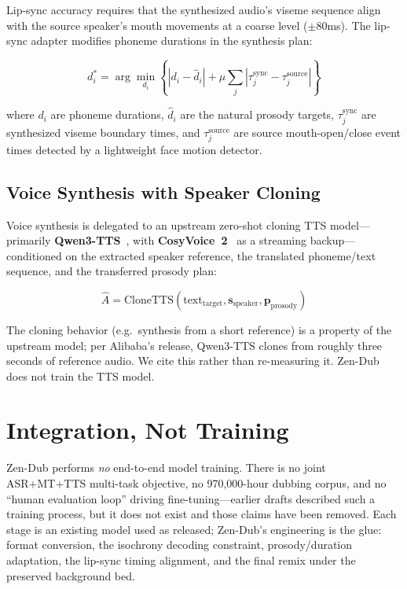 \documentclass[11pt,a4paper]{article}
\begin{document}
Lip-sync accuracy requires that the synthesized audio's viseme sequence align with
the source speaker's mouth movements at a coarse level ($\pm$80ms). The lip-sync
adapter modifies phoneme durations in the synthesis plan:

\begin{equation}
d_i^* = \arg\min_{d_i} \left\{ |d_i - \hat{d}_i| + \mu \sum_j | \tau_j^{\text{sync}} - \tau_j^{\text{source}} | \right\}
\end{equation}

where $d_i$ are phoneme durations, $\hat{d}_i$ are the natural prosody targets,
$\tau_j^{\text{sync}}$ are synthesized viseme boundary times, and $\tau_j^{\text{source}}$
are source mouth-open/close event times detected by a lightweight face motion detector.

\subsection{Voice Synthesis with Speaker Cloning}

Voice synthesis is delegated to an upstream zero-shot cloning TTS model---primarily
\textbf{Qwen3-TTS}~\cite{qwen3tts}, with \textbf{CosyVoice~2}~\cite{cosyvoice2} as a
streaming backup---conditioned on the extracted speaker reference, the translated
phoneme/text sequence, and the transferred prosody plan:

\begin{equation}
\hat{A} = \text{CloneTTS}\!\left(\text{text}_{\text{target}}, \mathbf{s}_{\text{speaker}}, \mathbf{p}_{\text{prosody}}\right)
\end{equation}

The cloning behavior (e.g.\ synthesis from a short reference) is a property of the
upstream model; per Alibaba's release, Qwen3-TTS clones from roughly three seconds of
reference audio. We cite this rather than re-measuring it. Zen-Dub does not train the
TTS model.

\section{Integration, Not Training}
\label{sec:training}

Zen-Dub performs \emph{no} end-to-end model training. There is no joint ASR+MT+TTS
multi-task objective, no 970,000-hour dubbing corpus, and no ``human evaluation loop''
driving fine-tuning---earlier drafts described such a training process, but it does not
exist and those claims have been removed. Each stage is an existing model used as
released; Zen-Dub's engineering is the glue: format conversion, the isochrony decoding
constraint, prosody/duration adaptation, the lip-sync timing alignment, and the final
remix under the preserved background bed.
\end{document}
